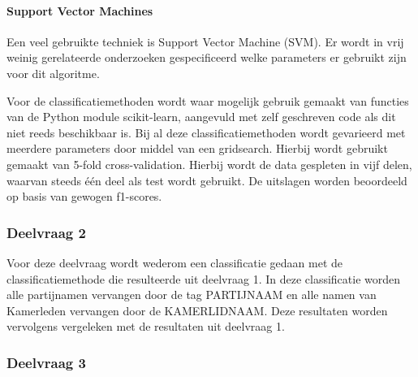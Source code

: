 \paragraph{Support Vector Machines}
Een veel gebruikte techniek is Support Vector Machine (SVM). Er wordt in vrij weinig gerelateerde onderzoeken gespecificeerd welke parameters er gebruikt zijn voor dit algoritme.\par
\bigskip
Voor de classificatiemethoden wordt waar mogelijk gebruik gemaakt van functies van de Python module scikit-learn\cite{scikit-learn}, aangevuld met zelf geschreven code als dit niet reeds beschikbaar is. Bij al deze classificatiemethoden wordt gevarieerd met meerdere parameters door middel van een gridsearch. Hierbij wordt gebruikt gemaakt van 5-fold cross-validation. Hierbij wordt de data gespleten in vijf delen, waarvan steeds één deel als test wordt gebruikt. De uitslagen worden beoordeeld op basis van gewogen f1-scores. 

\subsubsection{Deelvraag 2}

Voor deze deelvraag wordt wederom een classificatie gedaan met de classificatiemethode die resulteerde uit deelvraag 1. In deze classificatie worden alle partijnamen vervangen door de tag PARTIJNAAM en alle namen van Kamerleden vervangen door de KAMERLIDNAAM. Deze resultaten worden vervolgens vergeleken met de resultaten uit deelvraag 1. 

\subsubsection{Deelvraag 3}

